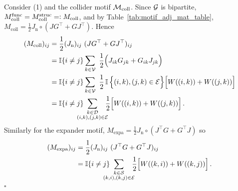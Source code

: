 \begin{prf} \label{proof:coll_expa_formulae}
%
Consider (1) and the collider motif $\mathcal{M}_\mathrm{coll}$. Since $\mathcal{G}$ is bipartite, $M_\mathrm{coll}^\mathrm{func} = M_\mathrm{coll}^\mathrm{struc} = \vcentcolon M_\mathrm{coll}$, and by Table~\ref{tab:motif_adj_mat_table},  $M_\mathrm{coll} = \frac{1}{2} J_\mathrm{n} \circ (J G^\top + G J^\top)$. Hence
%
\begin{align*}
	(M_\mathrm{coll})_{ij} &= \frac{1}{2} (J_\mathrm{n})_{ij} \ (J G^\top + G J^\top)_{ij} \\
	&= \bb{I}\{i \neq j\} \sum_{k \in \ca{V}} \ \frac{1}{2} \Big(J_{ik} G_{jk} + G_{ik} J_{jk} \Big) \\
	&= \bb{I}\{i \neq j\} \sum_{k \in \ca{V}} \ \frac{1}{2} \,\bb{I} \, \Big\{ (i,k),(j,k) \in \ca{E} \Big\} \Big[W((i,k)) + W((j,k))\Big] \\
	&= \bb{I} \{i \neq j\} \hspace*{-0.4cm} \sum_{\substack{k \in \ca{D} \\ (i,k), (j,k) \in \ca{E}}} \hspace*{-0.2cm} \frac{1}{2} \Big[ W((i,k)) + W((j,k)) \Big]\,.
\end{align*}
%
Similarly for the expander motif, $M_\mathrm{expa} = \frac{1}{2} J_\mathrm{n} \circ (J^\top G + G^\top J)$ so
%
\begin{align*}
	(M_\mathrm{expa})_{ij} &= \frac{1}{2} (J_\mathrm{n})_{ij} \ (J^\top G + G^\top J)_{ij} \\
	&= \bb{I} \{i \neq j\} \hspace*{-0.4cm} \sum_{\substack{k \in \ca{S} \\ (k,i), (k,j) \in \ca{E}}} \hspace*{-0.2cm} \frac{1}{2} \Big[ W((k,i)) + W((k,j)) \Big]\,.
\end{align*}
%
\hfill $\square$
\end{prf}




























